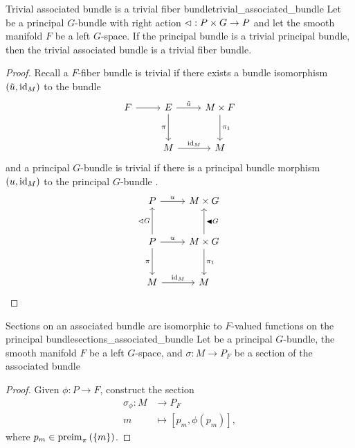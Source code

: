 \begin{theorem}{Trivial associated bundle is a trivial fiber bundle}{trivial_associated_bundle}
    Let  be a principal \(G\)-bundle with right action \(\mathbin{\vartriangleleft} : P \times G \to P\) and let the smooth manifold \(F\) be a left \(G\)-space. If the principal bundle  is a trivial principal bundle, then the trivial associated bundle  is a trivial fiber bundle.
\end{theorem}
\begin{proof}
    Recall a \(F\)-fiber bundle  is trivial if there exists a bundle isomorphism \((\tilde{u}, \operatorname{id}_{M})\) to the bundle 
\begin{equation*}
    \begin{tikzcd}[column sep = normal, row sep = large]
        F \arrow{r}{} & E \arrow[swap]{d}{\pi} \arrow{r}{\tilde{u}} & M \times F \arrow{d}{\pi_1}\\
                      & M \arrow{r}{\id{M}} & M
    \end{tikzcd}
\end{equation*}
and a principal \(G\)-bundle  is trivial if there is a principal bundle morphism \((u, \operatorname{id}_{M})\) to the principal \(G\)-bundle .
\begin{equation*}
    \begin{tikzcd}[column sep = normal, row sep = large]
        P \arrow{r}{u} & M \times G\\
        P \arrow{u}{\ract G} \arrow{r}{u} \arrow[swap]{d}{\pi} & M\times G \arrow[swap]{u}{\ractalt G} \arrow{d}{\pi_1}\\
        M \arrow{r}{\id{M}} & M
    \end{tikzcd}
\end{equation*}

\end{proof}

\begin{theorem}{Sections on an associated bundle are isomorphic to \(F\)-valued functions on the principal bundle}{sections_associated_bundle}
    Let  be a principal \(G\)-bundle, the smooth manifold \(F\) be a left \(G\)-space, and \(\sigma : M \to P_F\) be a section of the associated bundle 
\end{theorem}
\begin{proof}
    \todo[sketch:] Given \(\phi : P \to F\), construct the section
    \begin{align*}
        \sigma_\phi : M &\to P_F\\
                      m &\mapsto [p_m, \phi(p_m)],
    \end{align*}
    where \(p_m \in \operatorname{preim}_{\pi}{\left(\{m\}\right)}\). 
\end{proof}


